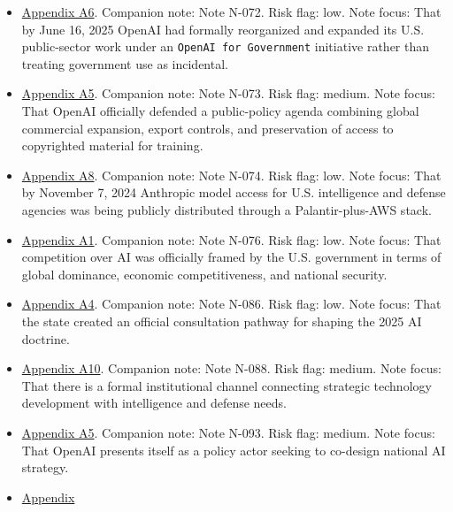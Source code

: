 \documentclass[
  american,
  11pt,
  letterpaper,
]{article}
\begin{document}
\begin{itemize}
  moved into an official federal consultation process.
\item
  \hyperref[appendix-a6-introducing-openai-for-government]{Appendix A6}.
  Companion note: Note N-072. Risk flag: low. Note focus: That by June
  16, 2025 OpenAI had formally reorganized and expanded its U.S.
  public-sector work under an \texttt{OpenAI\ for\ Government}
  initiative rather than treating government use as incidental.
\item
  \hyperref[appendix-a5-openais-proposals-for-the-us-ai-action-plan]{Appendix
  A5}. Companion note: Note N-073. Risk flag: medium. Note focus: That
  OpenAI officially defended a public-policy agenda combining global
  commercial expansion, export controls, and preservation of access to
  copyrighted material for training.
\item
  \hyperref[appendix-a8-anthropic-and-palantir-partner-to-bring-claude-ai-models-to-aws-for-u-s-government-intelligence-and-defense-operations]{Appendix
  A8}. Companion note: Note N-074. Risk flag: low. Note focus: That by
  November 7, 2024 Anthropic model access for U.S. intelligence and
  defense agencies was being publicly distributed through a
  Palantir-plus-AWS stack.
\item
  \hyperref[appendix-a1-removing-barriers-to-american-leadership-in-artificial-intelligence]{Appendix
  A1}. Companion note: Note N-076. Risk flag: low. Note focus: That
  competition over AI was officially framed by the U.S. government in
  terms of global dominance, economic competitiveness, and national
  security.
\item
  \hyperref[appendix-a4-request-for-information-on-the-development-of-an-artificial-intelligence-ai-action-plan]{Appendix
  A4}. Companion note: Note N-086. Risk flag: low. Note focus: That the
  state created an official consultation pathway for shaping the 2025 AI
  doctrine.
\item
  \hyperref[appendix-a10-in-q-tel]{Appendix A10}. Companion note: Note
  N-088. Risk flag: medium. Note focus: That there is a formal
  institutional channel connecting strategic technology development with
  intelligence and defense needs.
\item
  \hyperref[appendix-a5-openais-proposals-for-the-us-ai-action-plan]{Appendix
  A5}. Companion note: Note N-093. Risk flag: medium. Note focus: That
  OpenAI presents itself as a policy actor seeking to co-design national
  AI strategy.
\item
  \hyperref[appendix-a1-removing-barriers-to-american-leadership-in-artificial-intelligence]{Appendix
}
\end{itemize}
\end{document}

